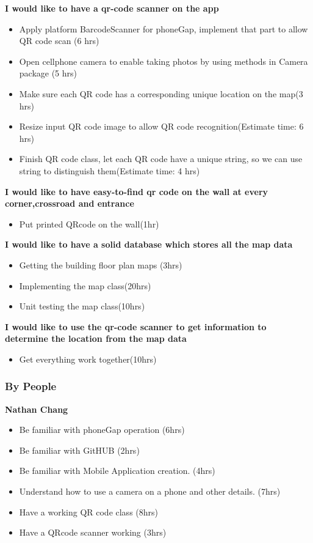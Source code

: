 \documentclass[12pt]{article}
\begin{document}
\textbf{I would like to have a qr-code scanner on the app}
\begin{itemize}
\item Apply platform BarcodeScanner for phoneGap, implement that part to allow QR code scan (6 hrs)
\item Open cellphone camera to enable taking photos by using methods in Camera package (5 hrs)
\item Make sure each QR code has a corresponding unique location on the map(3 hrs)
\item Resize input QR code image to allow QR code recognition(Estimate time: 6 hrs) 
\item Finish QR code class, let each QR code have a unique string, so we can use string to distinguish them(Estimate time: 4 hrs)
\end{itemize}


\textbf{I would like to have easy-to-find qr code on the wall at every corner,crossroad and entrance}
\begin{itemize}
\item Put printed QRcode on the wall(1hr)
\end{itemize}


\textbf{I would like to have a solid database which stores all the map data}
\begin{itemize}
\item Getting the building floor plan maps (3hrs)
\item Implementing the map class(20hrs)
\item Unit testing the map class(10hrs)
\end{itemize}

\textbf{I would like to use the qr-code scanner to get information to determine the location from the map data}
\begin{itemize}
\item Get everything work together(10hrs)
\end{itemize}



\subsubsection{By People}
\textbf{Nathan Chang}
\begin{itemize}
\item Be familiar with phoneGap operation (6hrs)
\item Be familiar with GitHUB (2hrs)
\item Be familiar with Mobile Application creation. (4hrs)
\item Understand how to use a camera on a phone and other details. (7hrs)
\item Have a working QR code class (8hrs)
\item Have a QRcode scanner working   (3hrs)
\end{itemize}
\end{document}
